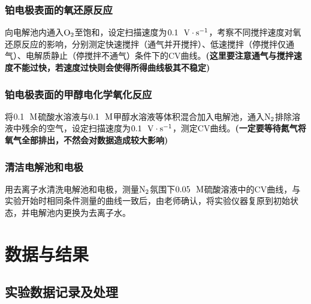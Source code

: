 \documentclass[12pt]{article}
\begin{document}
		\subsubsection{铂电极表面的氧还原反应}
			向电解池内通入$\rm O_{2}$至饱和，设定扫描速度为$0.1\ \ {\rm V\cdot s^{-1}}$，考察不同搅拌速度对氧还原反应的影响，分别测定快速搅拌（通气并开搅拌）、低速搅拌（停搅拌仅通气）、电解质静止（停搅拌不通气）条件下的CV曲线。\textbf{(这里要注意通气与搅拌速度不能过快，若速度过快则会使得所得曲线极其不稳定)}\par
		\subsubsection{铂电极表面的甲醇电化学氧化反应}
			将$0.1\ \ {\rm M}$硫酸水溶液与$0.1\ \ {\rm M}$甲醇水溶液等体积混合加入电解池，通入$\rm N_{2}$排除溶液中残余的空气，设定扫描速度为$0.1\ \ {\rm V\cdot s^{-1}}$，测定CV曲线。\textbf{(一定要等待氮气将氧气全部排出，不然会对数据造成较大影响)}\par
		\subsubsection{清洁电解池和电极}
			用去离子水清洗电解池和电极，测量$\rm N_{2}$氛围下$0.05\ \ {\rm M}$硫酸溶液中的CV曲线，与实验开始时相同条件测量的曲线一致后，由老师确认，将实验仪器复原到初始状态，并电解池内更换为去离子水。\par

	 \section{数据与结果}
 		\subsection{实验数据记录及处理}
\end{document}
